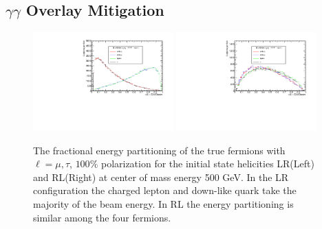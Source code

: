 \subsection{$\gamma\gamma$ Overlay Mitigation}
\label{subsec:Pileup_mitigation}
\begin{figure}

\includegraphics[width=0.48\textwidth]{hxLR.pdf}
\includegraphics[width=0.48\textwidth]{hxRL.pdf}
\caption{The fractional energy partitioning of the true fermions with $\ell = \mu,\tau$, $100\%$ polarization for the initial state helicities LR(Left) and RL(Right) at center of mass energy 500 GeV. In the LR configuration the charged lepton and down-like quark take the majority of the beam energy. In RL the energy partitioning is similar among the four fermions. }
\label{fig:Epartition}
\end{figure}

